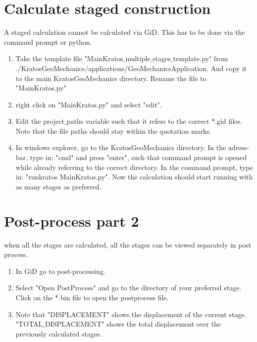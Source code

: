 \section{Calculate staged construction}
A staged calculation cannot be calculated via GiD. This has to be done via the command prompt or python.
\begin{enumerate}[resume]
	\item Take the template file "MainKratos$\_$multiple$\_$stages$\_$template.py" from ./KratosGeoMechanics/applications/GeoMechanicsApplication. And copy it to the main KratosGeoMechanics directory. Rename the file to "MainKratos.py"
	
	\item right click on "MainKratos.py" and select "edit". 
	\item Edit the project$\_$paths variable such that it refers to the correct *.gid files. Note that the file paths should stay within the quotation marks.
	
	\item In windows explorer, go to the KratosGeoMechanics directory. In the adress-bar, type in: "cmd" and press "enter", such that command prompt is opened while already referring to the correct directory. In the command prompt, type in: "runkratos MainKratos.py". Now the calculation should start running with as many stages as preferred. 
	
\end{enumerate}

\section{Post-process part 2}
when all the stages are calculated, all the stages can be viewed separately in post process.

\begin{enumerate}[resume]
	\item In GiD go to post-processing. 
	\item Select "Open PostProcess" and go to the directory of your preferred stage. Click on the *.bin file to open the postprocess file. 
	\item Note that "DISPLACEMENT" shows the displacement of the current stage. "TOTAL$\_$DISPLACEMENT" shows the total displacement over the previously calculated stages. 
	
\end{enumerate}


	
